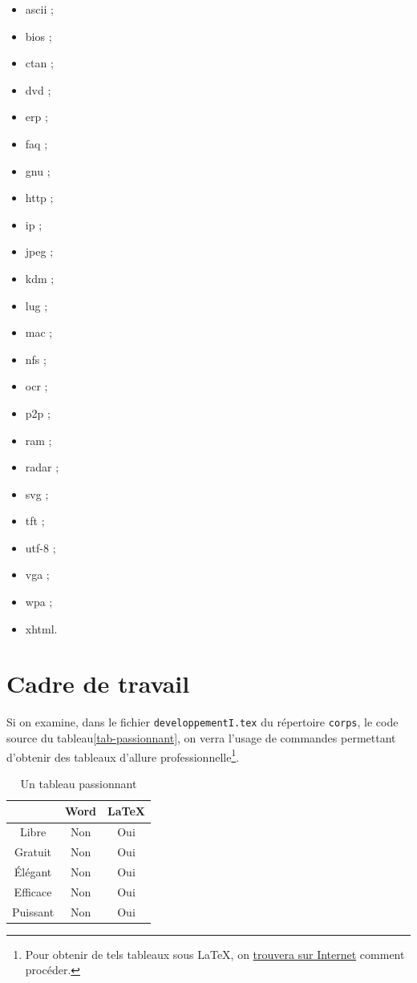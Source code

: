 \documentclass[12pt,space=onehalf,version=final]{yathesis}
\newcommand{\fichier}[1]{\texttt{#1}}
\begin{document}
\begin{itemize}
\item \gls{ascii} ;
\item \gls{bios} ;
\item \gls{ctan} ;
\item \gls{dvd} ;
\item \gls{erp} ;
\item \gls{faq} ;
\item \gls{gnu} ;
\item \gls{http} ;
\item \gls{ip} ;
\item \gls{jpeg} ;
\item \gls{kdm} ;
\item \gls{lug} ;
\item \gls{mac} ;
\item \gls{nfs} ;
\item \gls{ocr} ;
\item \gls{p2p} ;
\item \gls{ram} ;
\item \gls{radar} ;
\item \gls{svg} ;
\item \gls{tft} ;
\item \gls{utf-8} ;
\item \gls{vga} ;
\item \gls{wpa} ;
\item \gls{xhtml}.
\end{itemize}
%
\section{Cadre de travail}\label{sec-cadre}
%
Si on examine, dans le fichier
\fichier{developpementI.tex} du répertoire \fichier{corps}, le code source
du tableau\vref{tab-passionnant}, on verra l'usage
de commandes permettant d'obtenir des tableaux d'allure
professionnelle\footnote{Pour obtenir de tels tableaux sous \LaTeX{}, on
  \href{http://www.tug.org/pracjourn/2007-1/mori/mori.pdf}{trouvera sur
    Internet} comment procéder.}.
%
\begin{table}[ht]
  \centering
  \begin{tabular}{ccc}
    \toprule
    \multicolumn{1}{c}{} & Word & \LaTeX{} \\
    \midrule
    Libre                & Non  & Oui      \\
    Gratuit              & Non  & Oui      \\
    Élégant              & Non  & Oui      \\
    Efficace             & Non  & Oui      \\
    Puissant             & Non  & Oui      \\
    \bottomrule
  \end{tabular}
  \caption{Un tableau passionnant}
  \label{tab-passionnant}
\end{table}
\end{document}
